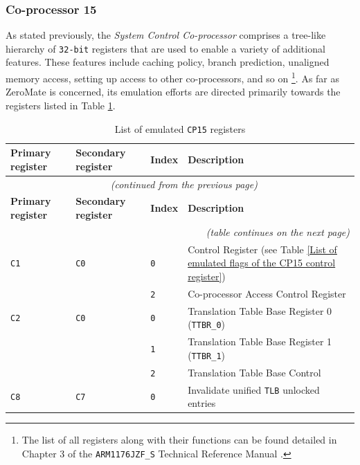 \documentclass[english, ing, kiv, he, iso690numb, pdf]{fasthesis}
\begin{document}
	\subsubsection{Co-processor 15}
	
	As stated previously, the \textit{System Control Co-processor} comprises a tree-like hierarchy of \texttt{32-bit} registers that are used to enable a variety of additional features. These features include caching policy, branch prediction, unaligned memory access, setting up access to other co-processors, and so on \footnote{The list of all registers along with their functions can be found detailed in Chapter 3 of the \texttt{ARM1176JZF\_S} Technical Reference Manual \cite{ARM1176JZF-S}.}. As far as ZeroMate is concerned, its emulation efforts are directed primarily towards the registers listed in Table \ref{List of emulated CP15 registers}.
	
	\newpage
	
	\begin{center}
		\begin{longtable}{p{}p{}p{}p{}}
			\caption{List of emulated \texttt{CP15} registers}
			\label{List of emulated CP15 registers}\\
			\toprule[1.5pt]
			\textbf{Primary register} & \textbf{Secondary register} & \textbf{Index} & \textbf{Description}\\
			\midrule
			\endfirsthead
			\multicolumn{4}{c}{\tablename{}~\thetable{} \textit{(continued from the previous page)}}\\
			\midrule
			\textbf{Primary register} & \textbf{Secondary register} & \textbf{Index} & \textbf{Description}\\
			\midrule
			\endhead
			\midrule
			\multicolumn{4}{r}{\textit{(table continues on the next page)}}\\
			\endfoot
			\bottomrule[1.5pt]
			\endlastfoot
			\texttt{C1} & \texttt{C0} & \texttt{0} & Control Register (see Table \ref{List of emulated flags of the CP15 control register})\\
			&  & \texttt{2} & Co-processor Access Control Register\\
			\midrule
			\texttt{C2} & \texttt{C0} & \texttt{0} & Translation Table Base Register 0 (\texttt{TTBR\_0})\\
			&  & \texttt{1} &Translation Table Base Register 1 (\texttt{TTBR\_1})\\
			&  & \texttt{2} & Translation Table Base Control\\
			\midrule
			\texttt{C8} & \texttt{C7} & \texttt{0} & Invalidate unified \texttt{TLB} unlocked entries\\
		\end{longtable}
	\end{center}
	
\end{document}

